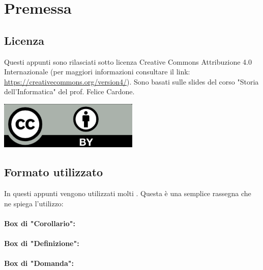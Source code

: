 \chapter{Premessa}

\section{Licenza}

Questi appunti sono rilasciati sotto licenza Creative Commons Attribuzione 4.0 Internazionale (per maggiori
informazioni consultare il link: \href{https://creativecommons.org/version4/}{https://creativecommons.org/version4/}). Sono basati sulle slides del corso "Storia dell'Informatica" del prof. Felice Cardone.
\begin{center}
    \includegraphics[width=0.5\textwidth]{images/cc.png}
\end{center}

\section{Formato utilizzato}

In questi appunti vengono utilizzati molti . Questa è una semplice 
rassegna che ne spiega l'utilizzo:

\subsubsection{Box di "Corollario":}


\subsubsection{Box di "Definizione":}


\subsubsection{Box di "Domanda":}


